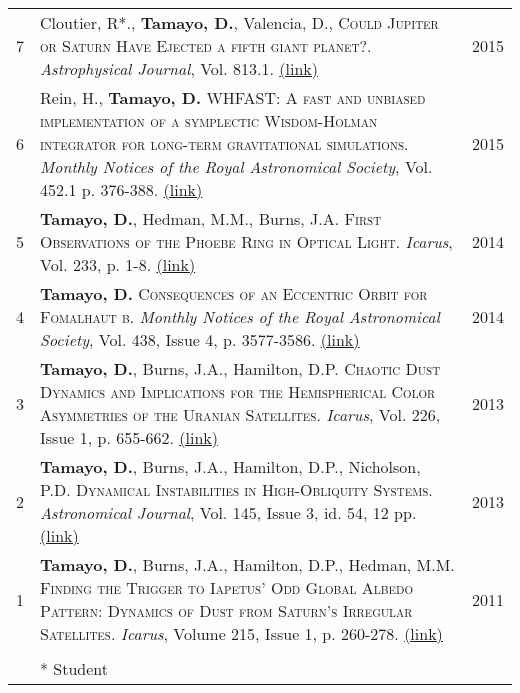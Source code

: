 \documentclass[10pt]{article} %
\begin{document}
{\begin{tabular}{>{\hfill}r|p{14.3cm}l}
7 & Cloutier, R*., {\bf Tamayo, D.}, Valencia, D., \textsc{Could Jupiter or Saturn Have Ejected a fifth giant planet?}.  {\it Astrophysical Journal}, Vol. 813.1. \href{http://arxiv.org/abs/1509.05397}{(link)} & 2015 \\

6 & Rein, H., {\bf Tamayo, D.} \textsc{WHFAST: A fast and unbiased implementation of a symplectic Wisdom-Holman integrator for long-term gravitational simulations}. {\it Monthly Notices of the Royal Astronomical Society}, Vol. 452.1 p. 376-388. \href{http://arxiv.org/abs/1506.01084}{(link)} & 2015 \\

5 & {\bf Tamayo, D.}, Hedman, M.M., Burns, J.A. \textsc{First Observations of the Phoebe Ring in Optical Light}. {\it Icarus}, Vol. 233, p. 1-8. \href{http://arxiv.org/abs/1401.6166}{(link)}& 2014  \\

4 & {\bf Tamayo, D.} \textsc{Consequences of an Eccentric Orbit for Fomalhaut b}. {\it Monthly Notices of the Royal Astronomical Society}, Vol. 438, Issue 4, p. 3577-3586. \href{http://arxiv.org/abs/1312.7020}{(link)} & 2014 \\

3 & {\bf Tamayo, D.}, Burns, J.A., Hamilton, D.P. \textsc{Chaotic Dust Dynamics and Implications for the Hemispherical Color Asymmetries of the Uranian Satellites}. {\it Icarus}, Vol. 226, Issue 1, p. 655-662. \href{http://arxiv.org/abs/1306.3973}{(link)} & 2013 \\ 

2 & {\bf Tamayo, D.}, Burns, J.A., Hamilton, D.P., Nicholson, P.D. \textsc{Dynamical Instabilities in High-Obliquity Systems}. {\it Astronomical Journal}, Vol. 145, Issue 3, id. 54, 12 pp. \href{http://arxiv.org/abs/1212.0028}{(link)} & 2013 \\

1 & {\bf Tamayo, D.}, Burns, J.A., Hamilton, D.P., Hedman, M.M. \textsc{Finding the Trigger to Iapetus' Odd Global Albedo Pattern: Dynamics of Dust from Saturn's Irregular Satellites}. {\it Icarus}, Volume 215, Issue 1, p. 260-278. \href{http://arxiv.org/abs/1106.1893}{(link)} & 2011 \\

\multicolumn{3}{c}{} \\

& * Student
\end{tabular}

}
\end{document}
